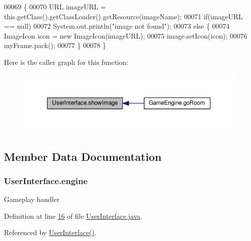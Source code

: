 \begin{DoxyCode}
00069                                             \{
00070         URL imageURL = this.getClass().getClassLoader().getResource(imageName);
00071         \textcolor{keywordflow}{if}(imageURL == null)
00072             System.out.println(\textcolor{stringliteral}{"image not found"});
00073         \textcolor{keywordflow}{else} \{
00074             ImageIcon icon = \textcolor{keyword}{new} ImageIcon(imageURL);
00075             image.setIcon(icon);
00076             myFrame.pack();
00077         \}
00078     \}
\end{DoxyCode}


Here is the caller graph for this function\-:
\nopagebreak
\begin{figure}[H]
\begin{center}
\leavevmode
\includegraphics[width=350pt]{classUserInterface_ab793a0f12878c698ba3e1720a9f86f3b_icgraph}
\end{center}
\end{figure}




\subsection{Member Data Documentation}
\hypertarget{classUserInterface_a661433c9712933f89b2cf30dfb10ffef}{
\subsubsection[{engine}]{ User\-Interface.\-engine\hspace{0.3cm}{\ttfamily [private]}}}\label{classUserInterface_a661433c9712933f89b2cf30dfb10ffef}
Gameplay handler 

Definition at line \hyperlink{UserInterface_8java_source_l00016}{16} of file \hyperlink{UserInterface_8java_source}{User\-Interface.\-java}.



Referenced by \hyperlink{UserInterface_8java_source_l00042}{User\-Interface()}.

